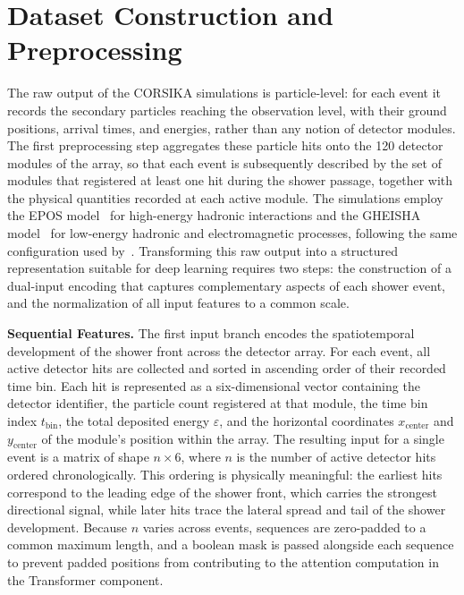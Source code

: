 \section{Dataset Construction and Preprocessing}

The raw output of the CORSIKA simulations is particle-level: for each event it records the secondary particles reaching the observation level, with their ground positions, arrival times, and energies, rather than any notion of detector modules. The first preprocessing step aggregates these particle hits onto the 120 detector modules of the array, so that each event is subsequently described by the set of modules that registered at least one hit during the shower passage, together with the physical quantities recorded at each active module. The simulations employ the EPOS model~ for high-energy hadronic interactions and the GHEISHA model~ for low-energy hadronic and electromagnetic processes, following the same configuration used by~. Transforming this raw output into a structured representation suitable for deep learning requires two steps: the construction of a dual-input encoding that captures complementary aspects of each shower event, and the normalization of all input features to a common scale.

\textbf{Sequential Features.} The first input branch encodes the spatiotemporal development of the shower front across the detector array. For each event, all active detector hits are collected and sorted in ascending order of their recorded time bin. Each hit is represented as a six-dimensional vector containing the detector identifier, the particle count registered at that module, the time bin index $t_{\text{bin}}$, the total deposited energy $\varepsilon$, and the horizontal coordinates $x_{\text{center}}$ and $y_{\text{center}}$ of the module's position within the array. The resulting input for a single event is a matrix of shape $n \times 6$, where $n$ is the number of active detector hits ordered chronologically. This ordering is physically meaningful: the earliest hits correspond to the leading edge of the shower front, which carries the strongest directional signal, while later hits trace the lateral spread and tail of the shower development. Because $n$ varies across events, sequences are zero-padded to a common maximum length, and a boolean mask is passed alongside each sequence to prevent padded positions from contributing to the attention computation in the Transformer component.

